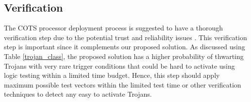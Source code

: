 \documentclass[conference]{IEEEtran}
\begin{document}
\subsection{Verification}
The COTS processor deployment process is suggested to have a thorough verification step due to the potential trust and reliability issues \cite{koch2012role}. %
This verification step is important since it complements our proposed solution. As discussed using Table \ref{trojan_class}, the proposed solution has a higher probability of thwarting Trojans with very rare trigger conditions that could be hard to activate using logic testing within a limited time budget. Hence, this step should apply maximum possible test vectors within the limited test time or other verification techniques to detect any easy to activate Trojans. 


% 
% 
% 
%



\end{document}
